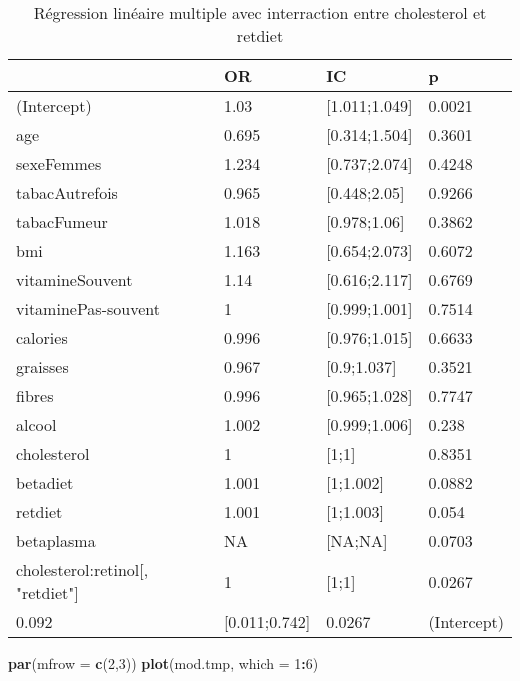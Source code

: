 \documentclass[]{article}
\newenvironment{Shaded}{\begin{snugshade}}{\end{snugshade}}
\newcommand{\KeywordTok}[1]{\textcolor[rgb]{0.13,0.29,0.53}{\textbf{#1}}}
\newcommand{\DataTypeTok}[1]{\textcolor[rgb]{0.13,0.29,0.53}{#1}}
\newcommand{\DecValTok}[1]{\textcolor[rgb]{0.00,0.00,0.81}{#1}}
\newcommand{\OperatorTok}[1]{\textcolor[rgb]{0.81,0.36,0.00}{\textbf{#1}}}
\newcommand{\NormalTok}[1]{#1}
\begin{document}
\begin{table}

\caption{\label{tab:unnamed-chunk-92}Régression linéaire multiple avec interraction entre cholesterol et retdiet}
\centering
\begin{tabular}[t]{l|l|l|l}
\hline
  & OR & IC & p\\
\hline
\rowcolor[HTML]{BBD2E1}  (Intercept) & 1.03 & [1.011;1.049] & 0.0021\\
\hline
age & 0.695 & [0.314;1.504] & 0.3601\\
\hline
\rowcolor[HTML]{BBD2E1}  sexeFemmes & 1.234 & [0.737;2.074] & 0.4248\\
\hline
tabacAutrefois & 0.965 & [0.448;2.05] & 0.9266\\
\hline
\rowcolor[HTML]{BBD2E1}  tabacFumeur & 1.018 & [0.978;1.06] & 0.3862\\
\hline
bmi & 1.163 & [0.654;2.073] & 0.6072\\
\hline
\rowcolor[HTML]{BBD2E1}  vitamineSouvent & 1.14 & [0.616;2.117] & 0.6769\\
\hline
vitaminePas-souvent & 1 & [0.999;1.001] & 0.7514\\
\hline
\rowcolor[HTML]{BBD2E1}  calories & 0.996 & [0.976;1.015] & 0.6633\\
\hline
graisses & 0.967 & [0.9;1.037] & 0.3521\\
\hline
\rowcolor[HTML]{BBD2E1}  fibres & 0.996 & [0.965;1.028] & 0.7747\\
\hline
alcool & 1.002 & [0.999;1.006] & 0.238\\
\hline
\rowcolor[HTML]{BBD2E1}  cholesterol & 1 & [1;1] & 0.8351\\
\hline
betadiet & 1.001 & [1;1.002] & 0.0882\\
\hline
\rowcolor[HTML]{BBD2E1}  retdiet & 1.001 & [1;1.003] & 0.054\\
\hline
betaplasma & NA & [NA;NA] & 0.0703\\
\hline
\rowcolor[HTML]{BBD2E1}  cholesterol:retinol[, "retdiet"] & 1 & [1;1] & 0.0267\\
\hline
0.092 & [0.011;0.742] & 0.0267 & (Intercept)\\
\hline
\end{tabular}
\end{table}

\begin{Shaded}
\begin{Highlighting}[]
\KeywordTok{par}\NormalTok{(}\DataTypeTok{mfrow =} \KeywordTok{c}\NormalTok{(}\DecValTok{2}\NormalTok{,}\DecValTok{3}\NormalTok{))}
\KeywordTok{plot}\NormalTok{(mod.tmp, }\DataTypeTok{which =} \DecValTok{1}\OperatorTok{:}\DecValTok{6}\NormalTok{)}
\end{Highlighting}
\end{Shaded}
\end{document}
